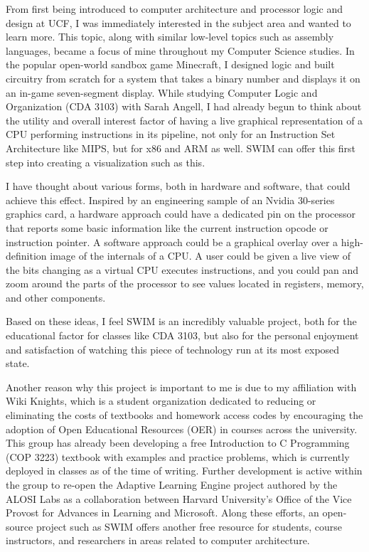 \documentclass[
    paper=letter,
    parskip=half,
    fontsize=12pt,
    titlepage=firstiscover,
    toc=bibliography,
    numbers=endperiod
]{scrartcl}
\begin{document}
From first being introduced to computer architecture and processor logic
and design at UCF, I was immediately interested in the subject area and
wanted to learn more. This topic, along with similar low-level topics
such as assembly languages, became a focus of mine throughout my
Computer Science studies. In the popular open-world sandbox game
Minecraft, I designed logic and built circuitry from scratch for a
system that takes a binary number and displays it on an in-game
seven-segment display. While studying Computer Logic and Organization
(CDA 3103) with Sarah Angell, I had already begun to think about the
utility and overall interest factor of having a live graphical
representation of a CPU performing instructions in its pipeline, not
only for an Instruction Set Architecture like MIPS, but for x86 and ARM
as well. SWIM can offer this first step into creating a visualization
such as this.

I have thought about various forms, both in hardware and software, that
could achieve this effect. Inspired by an engineering sample of an
Nvidia 30-series graphics card, a hardware approach could have a
dedicated pin on the processor that reports some basic information like
the current instruction opcode or instruction pointer. A software
approach could be a graphical overlay over a high-definition image of
the internals of a CPU. A user could be given a live view of the bits
changing as a virtual CPU executes instructions, and you could pan and
zoom around the parts of the processor to see values located in
registers, memory, and other components.

Based on these ideas, I feel SWIM is an incredibly valuable project,
both for the educational factor for classes like CDA 3103, but also for
the personal enjoyment and satisfaction of watching this piece of
technology run at its most exposed state.

Another reason why this project is important to me is due to my
affiliation with Wiki Knights, which is a student organization dedicated
to reducing or eliminating the costs of textbooks and homework access
codes by encouraging the adoption of Open Educational Resources (OER) in
courses across the university. This group has already been developing a
free Introduction to C Programming (COP 3223) textbook with examples and
practice problems, which is currently deployed in classes as of the time
of writing. Further development is active within the group to re-open
the Adaptive Learning Engine project authored by the ALOSI Labs as a
collaboration between Harvard University's Office of the Vice Provost
for Advances in Learning and Microsoft. Along these efforts, an
open-source project such as SWIM offers another free resource for
students, course instructors, and researchers in areas related to
computer architecture.
\end{document}
